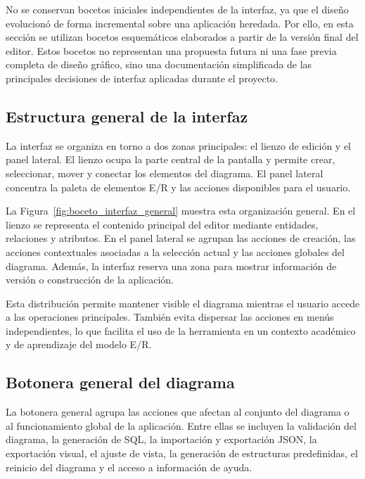 No se conservan bocetos iniciales independientes de la interfaz, ya que el diseño evolucionó de forma incremental sobre una aplicación heredada. Por ello, en esta sección se utilizan bocetos esquemáticos elaborados a partir de la versión final del editor. Estos bocetos no representan una propuesta futura ni una fase previa completa de diseño gráfico, sino una documentación simplificada de las principales decisiones de interfaz aplicadas durante el proyecto.

\subsection{Estructura general de la interfaz}

La interfaz se organiza en torno a dos zonas principales: el lienzo de edición y el panel lateral. El lienzo ocupa la parte central de la pantalla y permite crear, seleccionar, mover y conectar los elementos del diagrama. El panel lateral concentra la paleta de elementos E/R y las acciones disponibles para el usuario.


La Figura~\ref{fig:boceto_interfaz_general} muestra esta organización general. En el lienzo se representa el contenido principal del editor mediante entidades, relaciones y atributos. En el panel lateral se agrupan las acciones de creación, las acciones contextuales asociadas a la selección actual y las acciones globales del diagrama. Además, la interfaz reserva una zona para mostrar información de versión o construcción de la aplicación.

Esta distribución permite mantener visible el diagrama mientras el usuario accede a las operaciones principales. También evita dispersar las acciones en menús independientes, lo que facilita el uso de la herramienta en un contexto académico y de aprendizaje del modelo E/R.

\subsection{Botonera general del diagrama}

La botonera general agrupa las acciones que afectan al conjunto del diagrama o al funcionamiento global de la aplicación. Entre ellas se incluyen la validación del diagrama, la generación de SQL, la importación y exportación JSON, la exportación visual, el ajuste de vista, la generación de estructuras predefinidas, el reinicio del diagrama y el acceso a información de ayuda.

